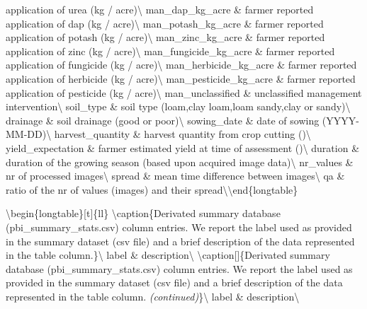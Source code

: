 \documentclass[
  landscape]{article}
\begin{document}
application of urea (kg / acre)\textbackslash{} man\_dap\_kg\_acre \&
farmer reported application of dap (kg / acre)\textbackslash{}
man\_potash\_kg\_acre \& farmer reported application of potash (kg /
acre)\textbackslash{} \addlinespace man\_zinc\_kg\_acre \& farmer
reported application of zinc (kg / acre)\textbackslash{}
man\_fungicide\_kg\_acre \& farmer reported application of fungicide (kg
/ acre)\textbackslash{} man\_herbicide\_kg\_acre \& farmer reported
application of herbicide (kg / acre)\textbackslash{}
man\_pesticide\_kg\_acre \& farmer reported application of pesticide (kg
/ acre)\textbackslash{} man\_unclassified \& unclassified management
intervention\textbackslash{} \addlinespace soil\_type \& soil type
(loam,clay loam,loam sandy,clay or sandy)\textbackslash{} drainage \&
soil drainage (good or poor)\textbackslash{} sowing\_date \& date of
sowing (YYYY-MM-DD)\textbackslash{} harvest\_quantity \& harvest
quantity from crop cutting ()\textbackslash{} yield\_expectation \&
farmer estimated yield at time of assessment ()\textbackslash{}
\addlinespace duration \& duration of the growing season (based upon
acquired image data)\textbackslash{} nr\_values \& nr of processed
images\textbackslash{} spread \& mean time difference between
images\textbackslash{} qa \& ratio of the nr of values (images) and
their spread\textbackslash* \textbackslash end\{longtable\}

\textbackslash begin\{longtable\}{[}t{]}\{ll\}
\textbackslash caption\{\label{tab:unnamed-chunk-2}Derivated summary
database (pbi\_summary\_stats.csv) column entries. We report the label
used as provided in the summary dataset (csv file) and a brief
description of the data represented in the table
column.\}\textbackslash{} \toprule label \& description\textbackslash{}
\midrule \endfirsthead \textbackslash caption{[}{]}\{Derivated summary
database (pbi\_summary\_stats.csv) column entries. We report the label
used as provided in the summary dataset (csv file) and a brief
description of the data represented in the table column.
\textit{(continued)}\}\textbackslash{} \toprule label \&
description\textbackslash{} \midrule \endhead

\endfoot
\bottomrule
\endlastfoot
\end{document}
